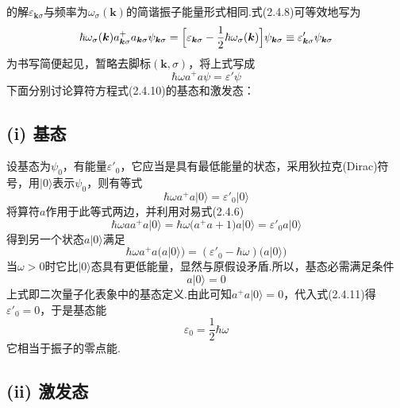 的解$\varepsilon_{\boldsymbol{k}\sigma}$与频率为$\omega_{\sigma}(\boldsymbol{k})$的简谐振子能量形式相同.式(2.4.8)可等效地写为
\begin{equation}
  \hbar\omega_{\sigma}(\boldsymbol{k})a_{\boldsymbol{k}\sigma}^{+}a_{\boldsymbol{k}\sigma}
  \psi_{\boldsymbol{k}\sigma}
  =\Bigl[\varepsilon_{\boldsymbol{k}\sigma}
  -\frac{1}{2}\hbar\omega_{\sigma}(\boldsymbol{k})\Bigr]\psi_{\boldsymbol{k}\sigma}
  \equiv\varepsilon'_{\boldsymbol{k}\sigma}\psi_{\boldsymbol{k}\sigma}
\end{equation}
为书写简便起见，暂略去脚标$(\boldsymbol{k},\sigma)$，将上式写成
\begin{equation}
  \hbar\omega a^{+}a\psi=\varepsilon'\psi
\end{equation}
下面分别讨论算符方程式(2.4.10)的基态和激发态：

\subsection*{(i) 基态}

设基态为$\psi_0$，有能量$\varepsilon'_0$，它应当是具有最低能量的状态，采用狄拉克(Dirac)符号，用$\lvert0\rangle$表示$\psi_0$，则有等式
\begin{equation}
  \hbar\omega a^{+}a\lvert0\rangle=\varepsilon'_0\lvert0\rangle
\end{equation}
将算符$a$作用于此等式两边，并利用对易式(2.4.6)
\begin{equation*}
  \hbar\omega aa^{+}a\lvert0\rangle
  =\hbar\omega\bigl(a^{+}a+1\bigr)a\lvert0\rangle
  =\varepsilon'_0a\lvert0\rangle
\end{equation*}
得到另一个状态$a\lvert0\rangle$满足
\begin{equation*}
  \hbar\omega a^{+}a\bigl(a\lvert0\rangle\bigr)
  =(\varepsilon'_0-\hbar\omega)\bigl(a\lvert0\rangle\bigr)
\end{equation*}
当$\omega>0$时它比$\lvert0\rangle$态具有更低能量，显然与原假设矛盾.所以，基态必需满足条件
\begin{equation}
  a\lvert0\rangle=0
\end{equation}
上式即二次量子化表象中的基态定义.由此可知$a^{+}a\lvert0\rangle=0$，代入式(2.4.11)得$\varepsilon'_0=0$，于是基态能
\begin{equation}
  \varepsilon_0=\frac{1}{2}\hbar\omega
\end{equation}
它相当于振子的零点能.

\subsection*{(ii) 激发态}

